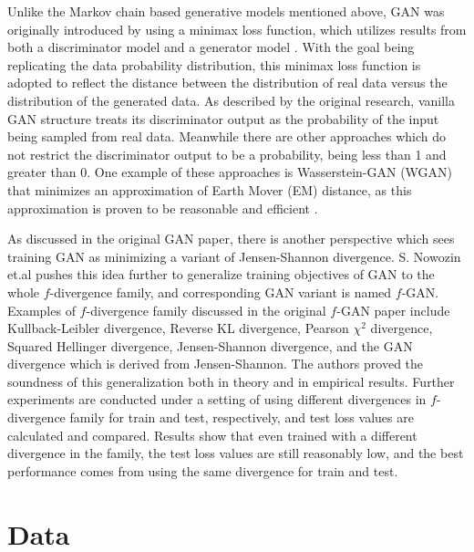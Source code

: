 \documentclass[10pt,twocolumn,letterpaper]{article}
\begin{document}
Unlike the Markov chain based generative models mentioned above, GAN was originally introduced by using a minimax loss function, which utilizes results from both a discriminator model and a generator model \cite{goodfellow2014generative}. With the goal being replicating the data probability distribution, this minimax loss function is adopted to reflect the distance between the distribution of real data versus the distribution of the generated data. As described by the original research, vanilla GAN structure treats its discriminator output as the probability of the input being sampled from real data. Meanwhile there are other approaches which do not restrict the discriminator output to be a probability, being less than 1 and greater than 0. One example of these approaches is Wasserstein-GAN (WGAN) that minimizes an approximation of Earth Mover (EM) distance, as this approximation is proven to be reasonable and efficient \cite{arjovsky2017wasserstein}.

As discussed in the original GAN paper, there is another perspective which sees training GAN as minimizing a variant of Jensen-Shannon divergence. S. Nowozin et.al \cite{nowozin2016fgan} pushes this idea further to generalize training objectives of GAN to the whole $f$-divergence family, and corresponding GAN variant is named $f$-GAN. Examples of $f$-divergence family discussed in the original $f$-GAN paper include Kullback-Leibler divergence, Reverse KL divergence, Pearson $\chi^2$ divergence, Squared Hellinger divergence, Jensen-Shannon divergence, and the GAN divergence which is derived from Jensen-Shannon. The authors proved the soundness of this generalization both in theory and in empirical results. Further experiments are conducted under a setting of using different divergences in $f$-divergence family for train and test, respectively, and test loss values are calculated and compared. Results show that even trained with a different divergence in the family, the test loss values are still reasonably low, and the best performance comes from using the same divergence for train and test. 



\section{Data}
\label{data}
\end{document}
